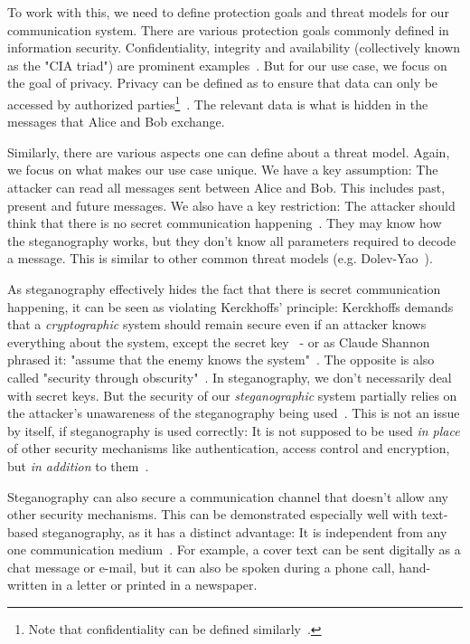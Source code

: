 To work with this, we need to define protection goals and threat models for our communication system. There are various protection goals commonly defined in information security. Confidentiality, integrity and availability (collectively known as the "CIA triad") are prominent examples~\cite{aliIoTSecurityReview2019,qadirReviewPaperCryptography2019,chowdhuryChatGPTThreatCIA2023}. But for our use case, we focus on the goal of privacy. Privacy can be defined as to ensure that data can only be accessed by authorized parties\footnote{Note that confidentiality can be defined similarly~\cite{chowdhuryChatGPTThreatCIA2023}.}~\cite{chowdhuryChatGPTThreatCIA2023}. The relevant data is what is hidden in the messages that Alice and Bob exchange.

Similarly, there are various aspects one can define about a threat model. Again, we focus on what makes our use case unique. We have a key assumption: The attacker can read all messages sent between Alice and Bob. This includes past, present and future messages. We also have a key restriction: The attacker should think that there is no secret communication happening~\cite{al-aniOverviewMainFundamentals2010}. They may know how the steganography works, but they don't know all parameters required to decode a message. This is similar to other common threat models (e.g. Dolev-Yao~\cite{dolevSecurityPublicKey1983}).

As steganography effectively hides the fact that there is secret communication happening, it can be seen as violating Kerckhoffs' principle: Kerckhoffs demands that a \textit{cryptographic} system should remain secure even if an attacker knows everything about the system, except the secret key~\cite{andersonLimitsSteganography1998,smithEffectiveSecurityObscurity2022} - or as Claude Shannon phrased it: "assume that the enemy knows the system"~\cite{shannonCommunicationTheorySecrecy1949}. The opposite is also called "security through obscurity"~\cite{smithEffectiveSecurityObscurity2022}. In steganography, we don't necessarily deal with secret keys. But the security of our \textit{steganographic} system partially relies on the attacker's unawareness of the steganography being used~\cite{al-aniOverviewMainFundamentals2010}. This is not an issue by itself, if steganography is used correctly: It is not supposed to be used \textit{in place} of other security mechanisms like authentication, access control and encryption, but \textit{in addition} to them~\cite{al-aniOverviewMainFundamentals2010}.

Steganography can also secure a communication channel that doesn't allow any other security mechanisms. This can be demonstrated especially well with text-based steganography, as it has a distinct advantage: It is independent from any one communication medium~\cite{zieglerNeuralLinguisticSteganography2019}. For example, a cover text can be sent digitally as a chat message or e-mail, but it can also be spoken during a phone call, hand-written in a letter or printed in a newspaper.

